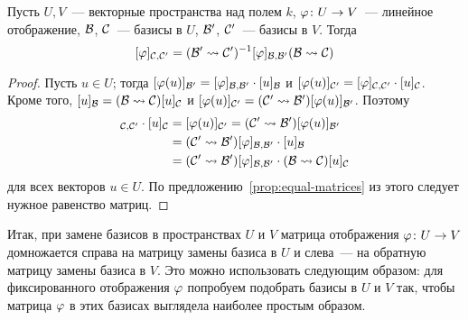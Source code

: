 \begin{theorem}\label{thm_matrix_under_change_of_bases}
Пусть $U,V$~--- векторные пространства над полем $k$,
$\varphi\colon U\to V$~--- линейное отображение,
 $\mathcal B$, $\mathcal
C$~--- базисы в $U$, $\mathcal B'$, $\mathcal C'$~--- базисы в $V$. Тогда
$$
[\varphi]_{\mathcal C,\mathcal C'} = (\mathcal B'\rightsquigarrow\mathcal C')^{-1}[\varphi]_{\mathcal B,\mathcal B'}(\mathcal
B\rightsquigarrow\mathcal C)
$$
\end{theorem}
\begin{proof}
Пусть $u\in U$; тогда
$[\varphi(u)]_{\mathcal B'} = [\varphi]_{\mathcal B,\mathcal B'}\cdot[u]_{\mathcal B}$
и $[\varphi(u)]_{\mathcal C'} = [\varphi]_{\mathcal C,\mathcal C'}\cdot[u]_{\mathcal C}$.
Кроме того, $[u]_{\mathcal B} = (\mathcal B\rightsquigarrow \mathcal C)[u]_{\mathcal C}$ и
$[\varphi(u)]_{\mathcal C'} = (\mathcal C'\rightsquigarrow \mathcal B')[\varphi(u)]_{\mathcal B'}$.
Поэтому
\begin{align*}
[\ph]_{\mc C,\mc C'}\cdot [u]_{\mc C} &= 
[\ph(u)]_{\mc C'} = (\mc C'\rsa\mc B')[\ph(u)]_{\mc B'} \\
&= (\mc C'\rsa\mc B')[\ph]_{\mc B,\mc B'}\cdot[u]_{\mc B} \\
&= (\mc C'\rsa\mc B')[\ph]_{\mc B,\mc B'}\cdot(\mc B\rsa\mc C)[u]_{\mc
  C}
\end{align*}
для всех векторов $u\in U$.
По предложению~\ref{prop:equal-matrices} из этого следует
нужное равенство матриц.
\end{proof}

Итак, при замене базисов в пространствах $U$ и $V$ матрица отображения
$\varphi\colon U\to V$ домножается справа на матрицу замены базиса в $U$ и
слева~--- на обратную матрицу замены базиса в $V$. Это можно
использовать следующим образом: для фиксированного отображения $\varphi$
попробуем подобрать базисы в $U$ и $V$ так, чтобы матрица $\varphi$ в этих
базисах выглядела наиболее простым образом.

